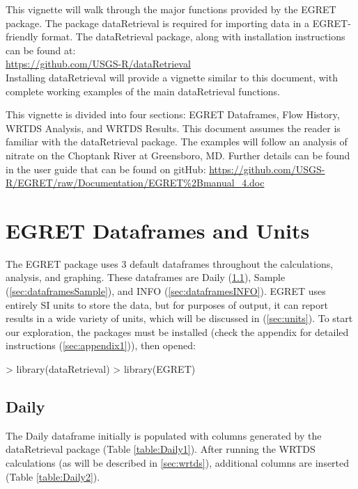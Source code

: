 \documentclass[a4paper,11pt]{article}
\begin{document}
This vignette will walk through the major functions provided by the EGRET package. The package dataRetrieval is required for importing data in a EGRET-friendly format. The dataRetrieval package, along with installation instructions can be found at:
\\
\url{https://github.com/USGS-R/dataRetrieval}
\\
Installing dataRetrieval will provide a vignette similar to this document, with complete working examples of the main dataRetrieval functions.

This vignette is divided into four sections: EGRET Dataframes, Flow History, WRTDS Analysis, and WRTDS Results. This document assumes the reader is familiar with the dataRetrieval package. The examples will follow an analysis of nitrate on the Choptank River at Greensboro, MD. Further details can be found in the user guide that can be found on gitHub: \url{https://github.com/USGS-R/EGRET/raw/Documentation/EGRET%2Bmanual_4.doc}


\section{EGRET Dataframes and Units}
\label{sec:dataframes}
The EGRET package uses 3 default dataframes throughout the calculations, analysis, and graphing. These dataframes are Daily (\ref{sec:dataframesDaily}), Sample (\ref{sec:dataframesSample}), and INFO (\ref{sec:dataframesINFO}). EGRET uses entirely SI units to store the data, but for purposes of output, it can report results in a wide variety of units, which will be discussed in (\ref{sec:units}). To start our exploration, the packages must be installed (check the appendix for detailed instructions (\ref{sec:appendix1})), then opened:
\begin{Schunk}
\begin{Sinput}
> library(dataRetrieval)
> library(EGRET)
\end{Sinput}
\end{Schunk}

\subsection{Daily}
\label{sec:dataframesDaily}
The Daily dataframe initially is populated with columns generated by the dataRetrieval package (Table \ref{table:Daily1}).  After running the WRTDS calculations (as will be described in \ref{sec:wrtds}), additional columns are inserted (Table \ref{table:Daily2}).
\end{document}
